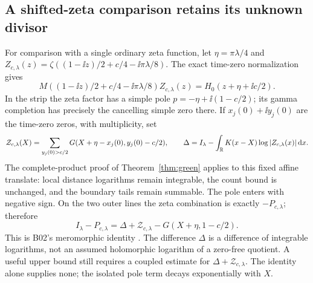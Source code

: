 \subsection{A shifted-zeta comparison retains its unknown divisor}
For comparison with a single ordinary zeta function, let
\(\eta=\pi\lambda/4\) and
\(Z_{c,\lambda}(z)=\zeta((1-\ii z)/2+c/4-\ii\pi\lambda/8)\).
The exact time-zero normalization gives
\[
 M((1-\ii z)/2+c/4-\ii\pi\lambda/8)Z_{c,\lambda}(z)
       =H_0(z+\eta+\ii c/2).
\]
In the strip the zeta factor has a simple pole
\(p=-\eta+\ii(1-c/2)\); its gamma completion has precisely the
cancelling simple zero there. If \(x_j(0)+\ii y_j(0)\) are the
time-zero zeros, with multiplicity, set
\[
 \mathcal Z_{c,\lambda}(X)=\sum_{y_j(0)>c/2}
       G(X+\eta-x_j(0),y_j(0)-c/2),\qquad
 \Delta=I_\lambda-\int_\mathbb R K(x-X)\log|Z_{c,\lambda}(x)|\,\mathrm d x.
\]
The complete-product proof of Theorem~\ref{thm:green} applies to this
fixed affine translate: local distance logarithms remain integrable,
the count bound is unchanged, and the boundary tails remain summable.
The pole enters with negative sign. On the two outer lines the zeta
combination is exactly \(-P_{c,\lambda}\); therefore
\begin{equation}\label{eq:shifted-zeta-divisor}
 I_\lambda-P_{c,\lambda}
    =\Delta+\mathcal Z_{c,\lambda}-G(X+\eta,1-c/2).
\end{equation}
This is B02's meromorphic identity \cite{GNPRSComparisons}. The
difference \(\Delta\) is a difference of integrable logarithms, not
an assumed holomorphic logarithm of a zero-free quotient. A useful
upper bound still requires a coupled estimate for
\(\Delta+\mathcal Z_{c,\lambda}\). The identity alone supplies none;
the isolated pole term decays exponentially with \(X\).
